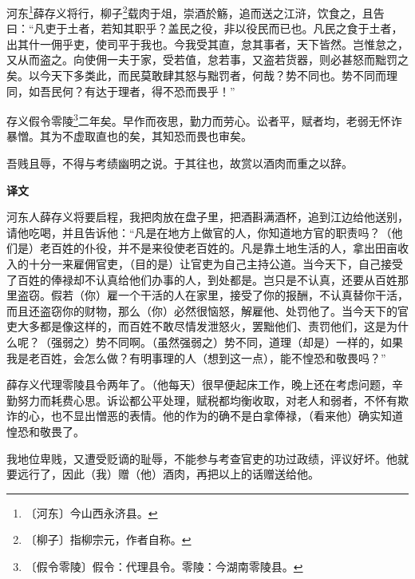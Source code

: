 \documentclass[12pt,UTF-8,openany,a4]{ctexbook}
\begin{document}
\begin{large}
    
    河东\footnote{〔河东〕\yiwen 今山西永济县。}薛存义将行，柳子\footnote{〔柳子〕\yiwen 指柳宗元，作者自称。}载肉于俎，崇酒於觞，追而送之江浒，饮食之，且告曰：“凡吏于土者，若知其职乎？盖民之役，非以役民而已也。凡民之食于土者，出其什一佣乎吏，使司平于我也。今我受其直，怠其事者，天下皆然。岂惟怠之，又从而盗之。向使佣一夫于家，受若值，怠若事，又盗若货器，则必甚怒而黜罚之矣。以今天下多类此，而民莫敢肆其怒与黜罚者，何哉？势不同也。势不同而理同，如吾民何？有达于理者，得不恐而畏乎！”
    
    存义假令零陵\footnote{〔假令零陵〕\yiwen 假令：代理县令。零陵：今湖南零陵县。}二年矣。早作而夜思，勤力而劳心。讼者平，赋者均，老弱无怀诈暴憎。其为不虚取直也的矣，其知恐而畏也审矣。
    
    吾贱且辱，不得与考绩幽明之说。于其往也，故赏以酒肉而重之以辞。
\end{large}


\newpage

\begin{Large}
    \noindent\textbf{译文}
\end{Large}


\vspace{1em}

\begin{large}
    \yiwen 
    河东人薛存义将要启程，我把肉放在盘子里，把酒斟满酒杯，追到江边给他送别，请他吃喝，并且告诉他：“凡是在地方上做官的人，你知道地方官的职责吗？（他们是）老百姓的仆役，并不是来役使老百姓的。凡是靠土地生活的人，拿出田亩收入的十分一来雇佣官吏，（目的是）让官吏为自己主持公道。当今天下，自己接受了百姓的俸禄却不认真给他们办事的人，到处都是。岂只是不认真，还要从百姓那里盗窃。假若（你）雇一个干活的人在家里，接受了你的报酬，不认真替你干活，而且还盗窃你的财物，那么（你）必然很恼怒，解雇他、处罚他了。当今天下的官吏大多都是像这样的，而百姓不敢尽情发泄怒火，罢黜他们、责罚他们，这是为什么呢？（强弱之）势不同啊。（虽然强弱之）势不同，道理（却是）一样的，如果我是老百姓，会怎么做？有明事理的人（想到这一点），能不惶恐和敬畏吗？”
    
    薛存义代理零陵县令两年了。（他每天）很早便起床工作，晚上还在考虑问题，辛勤努力而耗费心思。诉讼都公平处理，赋税都均衡收取，对老人和弱者，不怀有欺诈的心，也不显出憎恶的表情。他的作为的确不是白拿俸禄，（看来他）确实知道惶恐和敬畏了。
    
    我地位卑贱，又遭受贬谪的耻辱，不能参与考查官吏的功过政绩，评议好坏。他就要远行了，因此（我）赠（他）酒肉，再把以上的话赠送给他。
    
\end{large}
\end{document}
